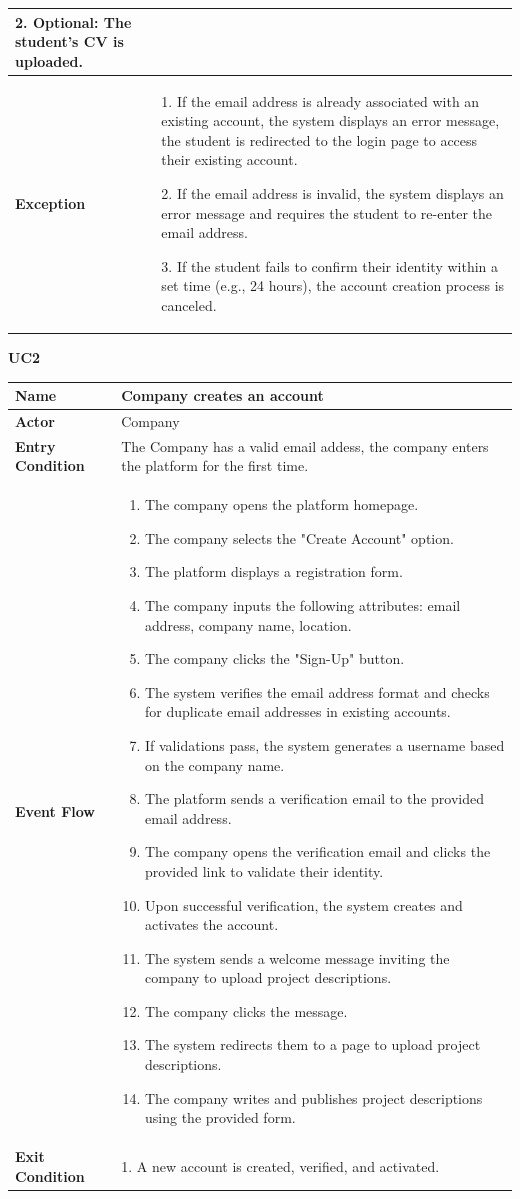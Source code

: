 \begin{longtable}{|p{}|p{}|}
2. Optional: The student’s CV is uploaded.\\
\hline
\textbf{Exception} & 
1. If the email address is already associated with an existing account, the system displays an error message, the student is redirected to the login page to access their existing account.	

2. If the email address is invalid, the system displays an error message and requires the student to re-enter the email address.	

3. If the student fails to confirm their identity within a set time (e.g., 24 hours), the account creation process is canceled.\\
\hline
\end{longtable}

\textbf{UC2}

\begin{longtable}{|p{}|p{}|}
\hline
\textbf{Name} & Company creates an account \\
\hline
\textbf{Actor} & Company\\
\hline
\textbf{Entry Condition} & The Company has a valid email addess, the company enters the platform for the first time. \\
\hline
\textbf{Event Flow} & 
\begin{enumerate}
    \item The company opens the platform homepage.
    \item The company selects the "Create Account" option.
    \item The platform displays a registration form.
    \item The company inputs the following attributes: email address, company name, location.
    \item The company clicks the "Sign-Up" button.
    \item The system verifies the email address format and checks for duplicate email addresses in existing accounts.
    \item If validations pass, the system generates a username based on the company name.	
    \item The platform sends a verification email to the provided email address.
    \item The company opens the verification email and clicks the provided link to validate their identity.
    \item Upon successful verification, the system creates and activates the account.
    \item The system sends a welcome message inviting the company to upload project descriptions.
    \item  The company clicks the message.
    \item The system redirects them to a page to upload project descriptions.
    \item  The company writes and publishes project descriptions using the provided form.
\end{enumerate} \\
\hline
\textbf{Exit Condition} & 
1. A new account is created, verified, and activated.


\end{longtable}
